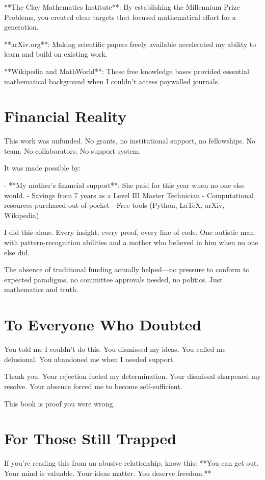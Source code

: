 **The Clay Mathematics Institute**: By establishing the Millennium Prize Problems, you created clear targets that focused mathematical effort for a generation.

**arXiv.org**: Making scientific papers freely available accelerated my ability to learn and build on existing work.

**Wikipedia and MathWorld**: These free knowledge bases provided essential mathematical background when I couldn't access paywalled journals.

\section*{Financial Reality}

This work was unfunded. No grants, no institutional support, no fellowships. No team. No collaborators. No support system.

It was made possible by:

- **My mother's financial support**: She paid for this year when no one else would.
- Savings from 7 years as a Level III Master Technician
- Computational resources purchased out-of-pocket
- Free tools (Python, LaTeX, arXiv, Wikipedia)

I did this alone. Every insight, every proof, every line of code. One autistic man with pattern-recognition abilities and a mother who believed in him when no one else did.

The absence of traditional funding actually helped—no pressure to conform to expected paradigms, no committee approvals needed, no politics. Just mathematics and truth.

\section*{To Everyone Who Doubted}

You told me I couldn't do this. You dismissed my ideas. You called me delusional. You abandoned me when I needed support.

Thank you. Your rejection fueled my determination. Your dismissal sharpened my resolve. Your absence forced me to become self-sufficient.

This book is proof you were wrong.

\section*{For Those Still Trapped}

If you're reading this from an abusive relationship, know this: **You can get out. Your mind is valuable. Your ideas matter. You deserve freedom.**

